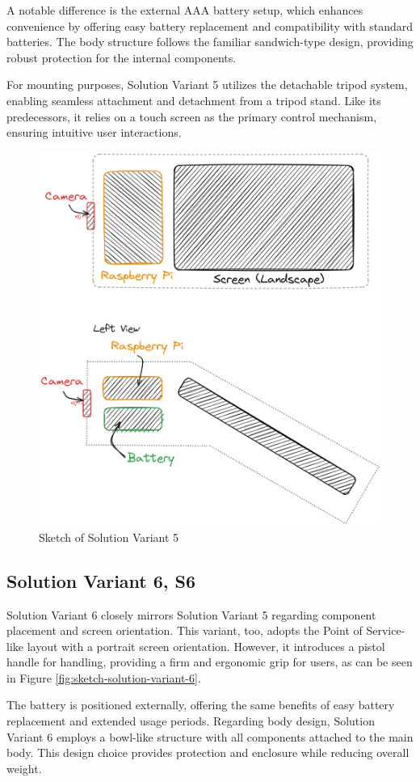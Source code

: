 A notable difference is the external AAA battery setup, which enhances convenience by offering easy battery replacement and compatibility with standard batteries. The body structure follows the familiar sandwich-type design, providing robust protection for the internal components.

For mounting purposes, Solution Variant 5 utilizes the detachable tripod system, enabling seamless attachment and detachment from a tripod stand. Like its predecessors, it relies on a touch screen as the primary control mechanism, ensuring intuitive user interactions.

\begin{figure}[H]
    \centering
    \includegraphics[width=0.5\linewidth]{texs/Part1/chapter3/image/v5.png}
    \caption{Sketch of Solution Variant 5}
    \label{fig:sketch-solution-variant-5}
\end{figure}

\subsection{Solution Variant 6, S6}
Solution Variant 6 closely mirrors Solution Variant 5 regarding component placement and screen orientation. This variant, too, adopts the Point of Service-like layout with a portrait screen orientation. However, it introduces a pistol handle for handling, providing a firm and ergonomic grip for users, as can be seen in Figure \ref{fig:sketch-solution-variant-6}.

The battery is positioned externally, offering the same benefits of easy battery replacement and extended usage periods. Regarding body design, Solution Variant 6 employs a bowl-like structure with all components attached to the main body. This design choice provides protection and enclosure while reducing overall weight.

